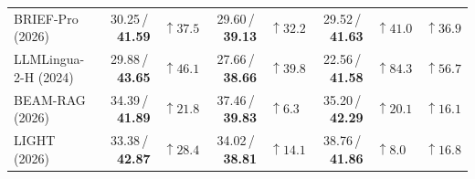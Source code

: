 \documentclass[border=10pt]{standalone}
\begin{document}
\begin{minipage}{5.5in}
{\begin{tabular*}{\linewidth}{@{\extracolsep{\fill}}lrlrlrll@{}}
BRIEF-Pro (2026) & 30.25\,/\,\textbf{41.59} & \textcolor{beamgain}{$\uparrow37.5$} & 29.60\,/\,\textbf{39.13} & \textcolor{beamgain}{$\uparrow32.2$} & 29.52\,/\,\textbf{41.63} & \textcolor{beamgain}{$\uparrow41.0$} & \textcolor{beamgain}{$\uparrow36.9$} \\
LLMLingua-2-H (2024) & 29.88\,/\,\textbf{43.65} & \textcolor{beamgain}{$\uparrow46.1$} & 27.66\,/\,\textbf{38.66} & \textcolor{beamgain}{$\uparrow39.8$} & 22.56\,/\,\textbf{41.58} & \textcolor{beamgain}{$\uparrow84.3$} & \textcolor{beamgain}{$\uparrow56.7$} \\
BEAM-RAG (2026) & 34.39\,/\,\textbf{41.89} & \textcolor{beamgain}{$\uparrow21.8$} & 37.46\,/\,\textbf{39.83} & \textcolor{beamgain}{$\uparrow6.3$} & 35.20\,/\,\textbf{42.29} & \textcolor{beamgain}{$\uparrow20.1$} & \textcolor{beamgain}{$\uparrow16.1$} \\
LIGHT (2026) & 33.38\,/\,\textbf{42.87} & \textcolor{beamgain}{$\uparrow28.4$} & 34.02\,/\,\textbf{38.81} & \textcolor{beamgain}{$\uparrow14.1$} & 38.76\,/\,\textbf{41.86} & \textcolor{beamgain}{$\uparrow8.0$} & \textcolor{beamgain}{$\uparrow16.8$} \\
\bottomrule
\end{tabular*}}
\par{}
\end{minipage}
\end{document}
